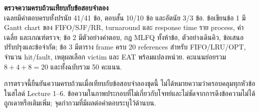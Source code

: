 \noindent\textbf{ตรวจความครบถ้วนเทียบกับข้อสอบจำลอง}\\
เฉลยมีคำตอบครบทั้งปรนัย 41/41 ข้อ, ตอบสั้น 10/10 ข้อ และอัตนัย 3/3 ข้อ. ข้อเขียนข้อ 1 มี Gantt chart ของ FIFO/SJF/RR, turnaround และ response time ราย process, ค่าเฉลี่ย และเกณฑ์ตรวจ; ข้อ 2 มีตัวอย่างคำตอบ, กฎ MLFQ ทั้งห้าข้อ, ตัวอย่างเดินคิว, ข้อเสนอปรับปรุงและข้อจำกัด; ข้อ 3 มีตาราง frame ครบ 20 references สำหรับ FIFO/LRU/OPT, จำนวน hit/fault, เหตุผลเลือก victim และ EAT พร้อมแปลงหน่วย. คะแนนย่อยรวม $8+4+8=20$ และทั้งฉบับรวม 50 คะแนน.\par
\noindent การตรวจนี้ยืนยันความครบถ้วนเมื่อเทียบกับข้อสอบจำลองชุดนี้ ไม่ได้หมายความว่าครอบคลุมทุกหัวข้อในสไลด์ Lecture 1--6. ข้อความในภาพประกอบที่ไม่เกี่ยวกับโจทย์และไม่ชัดจากการดึงข้อความไม่ได้ถูกเดาหรือเติมเพิ่ม; จุดกำกวมที่มีผลต่อคำตอบระบุไว้ด้านบน.\par\medskip

